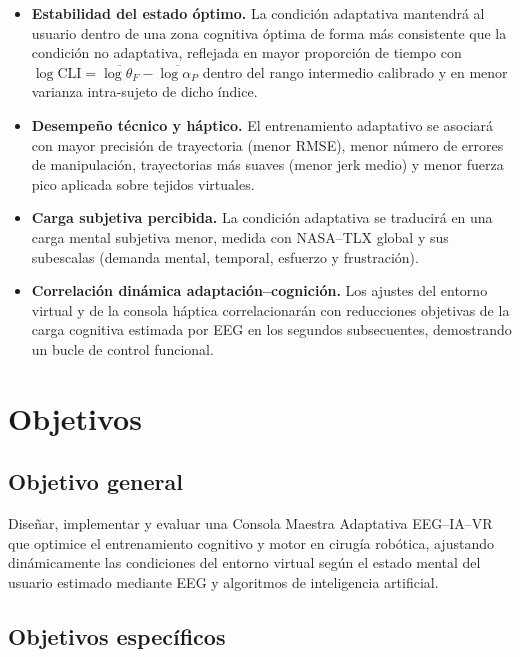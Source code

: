 \documentclass[12pt]{article}
\begin{document}
\begin{itemize}
    \item[\textbf{H2.}] \textbf{Estabilidad del estado óptimo.} La
    condición adaptativa mantendrá al usuario dentro de una zona
    cognitiva óptima de forma más consistente que la condición no
    adaptativa, reflejada en mayor proporción de tiempo con
    $\log\mathrm{CLI}=\overline{\log\theta_F}-\overline{\log\alpha_P}$
    dentro del rango intermedio calibrado y en menor varianza
    intra-sujeto de dicho índice.
    \item[\textbf{H3.}] \textbf{Desempeño técnico y háptico.} El
    entrenamiento adaptativo se asociará con mayor precisión de
    trayectoria (menor RMSE), menor número de errores de
    manipulación, trayectorias más suaves (menor jerk medio) y
    menor fuerza pico aplicada sobre tejidos virtuales.
    \item[\textbf{H4.}] \textbf{Carga subjetiva percibida.} La
    condición adaptativa se traducirá en una carga mental
    subjetiva menor, medida con NASA--TLX global y sus subescalas
    (demanda mental, temporal, esfuerzo y frustración).
    \item[\textbf{H5.}] \textbf{Correlación dinámica
    adaptación--cognición.} Los ajustes del entorno virtual y de
    la consola háptica correlacionarán con reducciones objetivas
    de la carga cognitiva estimada por EEG en los segundos
    subsecuentes, demostrando un bucle de control funcional.
\end{itemize}


\section{Objetivos}

\subsection*{Objetivo general}

Diseñar, implementar y evaluar una Consola Maestra Adaptativa
EEG--IA--VR que optimice el entrenamiento cognitivo y motor en
cirugía robótica, ajustando dinámicamente las condiciones del
entorno virtual según el estado mental del usuario estimado
mediante EEG y algoritmos de inteligencia artificial.

\subsection*{Objetivos específicos}
\end{document}

